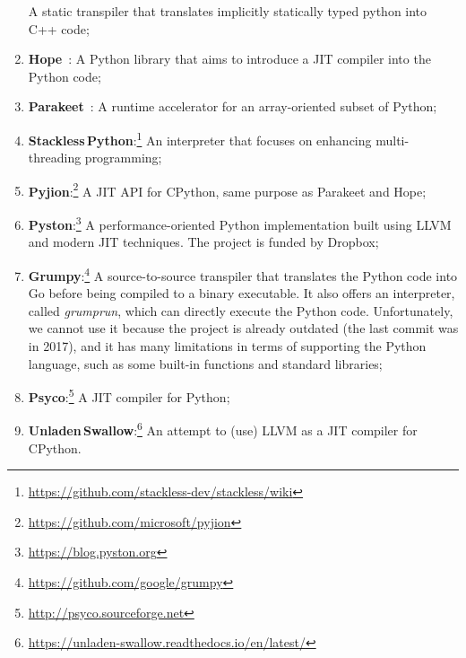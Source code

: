 \begin{enumerate}
            A static transpiler that translates implicitly statically typed python into C++ code;
      \item \textbf{Hope}~\cite{akeret_hope_2015}:
            A Python library that aims to introduce a JIT compiler into the Python code;
      \item \textbf{Parakeet}~\cite{rubinsteyn2012parakeet}:
            A runtime accelerator for an array-oriented subset of Python;
      \item \textbf{Stackless\,Python}:\footnote{\url{https://github.com/stackless-dev/stackless/wiki}}
            An interpreter that focuses on enhancing multi-threading programming;
      \item \textbf{Pyjion}:\footnote{\url{https://github.com/microsoft/pyjion}}
            A JIT API for CPython, same purpose as Parakeet and Hope;
      \item \textbf{Pyston}:\footnote{\url{https://blog.pyston.org}}
            A performance-oriented Python implementation built using LLVM and modern JIT techniques.
            The project is funded by Dropbox;
      \item \textbf{Grumpy}:\footnote{\url{https://github.com/google/grumpy}}
            A source-to-source transpiler that translates the Python code into Go before being compiled to a binary executable.
            It also offers an interpreter, called \emph{grumprun}, which can directly execute the Python code.
            Unfortunately, we cannot use it because the project is already outdated (the last commit was in 2017), and it has many limitations in terms of supporting the Python language, such as some built-in functions and standard libraries;
      \item \textbf{Psyco}:\footnote{\url{http://psyco.sourceforge.net}}
            A JIT compiler for Python;
      \item \textbf{Unladen\,Swallow}:\footnote{\url{https://unladen-swallow.readthedocs.io/en/latest/}}
            An attempt to (use) LLVM as a JIT compiler for CPython.
\end{enumerate}


